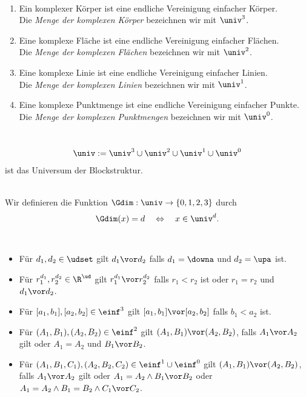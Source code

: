 \begin{dfn}\
    \begin{enumerate}
        \item Ein komplexer Körper ist eine endliche Vereinigung einfacher Körper.\\
            Die \emph{Menge der komplexen Körper} bezeichnen wir mit $\univ^3$.
        \item Eine komplexe Fläche ist eine endliche Vereinigung einfacher Flächen.\\
            Die \emph{Menge der komplexen Flächen} bezeichnen wir mit $\univ^2$.
        \item Eine komplexe Linie ist eine endliche Vereinigung einfacher Linien.\\
            Die \emph{Menge der komplexen Linien} bezeichnen wir mit $\univ^1$.
        \item Eine komplexe Punktmenge ist eine endliche Vereinigung einfacher Punkte.\\
            Die \emph{Menge der komplexen Punktmengen} bezeichnen wir mit $\univ^0$.
    \end{enumerate}
\end{dfn}


\begin{dfn}[Universum]\ 
    \begin{align*}
        \univ := \univ^3 \cup \univ^2 \cup \univ^1 \cup \univ^0
    \end{align*}
    ist das Universum der Blockstruktur.
\end{dfn}


\begin{dfn}\ \\
    Wir definieren die Funktion $\Gdim : \univ \to \{0,1,2,3\}$ durch
    $$\Gdim(x) = d \quad \Leftrightarrow \quad x \in \univ^d.$$
\end{dfn}


\begin{dfn}\ 
    \begin{itemize}
        \item Für $d_1,d_2 \in \udset$ gilt $d_1 \vor d_2$ falls $d_1 = \downa$ und $d_2 = \upa$ ist. 
        \item Für $r_1^{d_1},r_2^{d_2} \in \R^\ud$ gilt $r_1^{d_1} \vor r_2^{d_2}$ falls $r_1 < r_2$ ist oder $r_1 = r_2$ und $d_1 \vor d_2$.
        \item Für $[a_1,b_1], [a_2,b_2] \in \einf^3$ gilt $[a_1,b_1] \vor [a_2,b_2]$ falls $b_1 < a_2$ ist.
        \item Für $(A_1,B_1), (A_2,B_2) \in \einf^2$ gilt $(A_1,B_1) \vor (A_2,B_2)$, falls $A_1 \vor A_2$ gilt oder $A_1 = A_2$ und $B_1 \vor B_2$.
        \item Für $(A_1,B_1,C_1), (A_2,B_2,C_2) \in \einf^1 \cup \einf^0$ gilt $(A_1,B_1) \vor (A_2,B_2)$, falls $A_1 \vor A_2$ gilt oder $A_1 = A_2 \land B_1 \vor B_2$ oder $A_1 = A_2 \land B_1 = B_2 \land C_1 \vor C_2$.
    \end{itemize}
\end{dfn}

